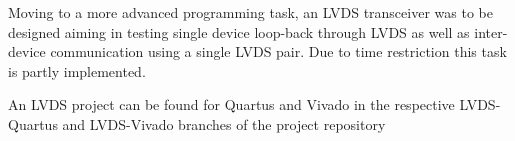 Moving to a more advanced programming task, an LVDS transceiver was to be designed aiming in testing single device loop-back through LVDS as well as  inter-device communication using a single LVDS pair. Due to time restriction this task is partly implemented.

An LVDS project can be found for Quartus and Vivado in the respective LVDS-Quartus\cite{fpga-toolbox-eval-repo-lvds-quartus} and LVDS-Vivado\cite{fpga-toolbox-eval-repo=lvds-vivado} branches of the project repository 
